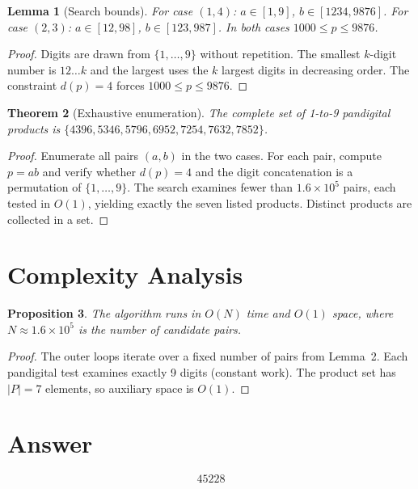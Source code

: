 \documentclass[12pt]{article}
\newtheorem{theorem}{Theorem}
\newtheorem{lemma}[theorem]{Lemma}
\newtheorem{proposition}[theorem]{Proposition}
\theoremstyle{definition}
\begin{document}
\begin{lemma}[Search bounds]
For case $(1,4)$: $a \in [1,9]$, $b \in [1234, 9876]$. For case $(2,3)$: $a \in [12, 98]$, $b \in [123, 987]$. In both cases $1000 \le p \le 9876$.
\end{lemma}

\begin{proof}
Digits are drawn from $\{1, \ldots, 9\}$ without repetition. The smallest $k$-digit number is $12\ldots k$ and the largest uses the $k$ largest digits in decreasing order. The constraint $d(p) = 4$ forces $1000 \le p \le 9876$.
\end{proof}

\begin{theorem}[Exhaustive enumeration]
The complete set of 1-to-9 pandigital products is $\{4396, 5346, 5796, 6952, 7254, 7632, 7852\}$.
\end{theorem}

\begin{proof}
Enumerate all pairs $(a,b)$ in the two cases. For each pair, compute $p = ab$ and verify whether $d(p) = 4$ and the digit concatenation is a permutation of $\{1,\ldots,9\}$. The search examines fewer than $1.6 \times 10^5$ pairs, each tested in $O(1)$, yielding exactly the seven listed products. Distinct products are collected in a set.
\end{proof}

\section{Complexity Analysis}

\begin{proposition}
The algorithm runs in $O(N)$ time and $O(1)$ space, where $N \approx 1.6 \times 10^5$ is the number of candidate pairs.
\end{proposition}

\begin{proof}
The outer loops iterate over a fixed number of pairs from Lemma~2. Each pandigital test examines exactly 9 digits (constant work). The product set has $|P| = 7$ elements, so auxiliary space is $O(1)$.
\end{proof}

\section{Answer}

\[
\boxed{45228}
\]
\end{document}
